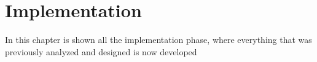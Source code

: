 \chapter{Implementation}
\label{cha:implementation}

In this chapter is shown all the implementation phase, where everything that was previously analyzed and designed is now developed





